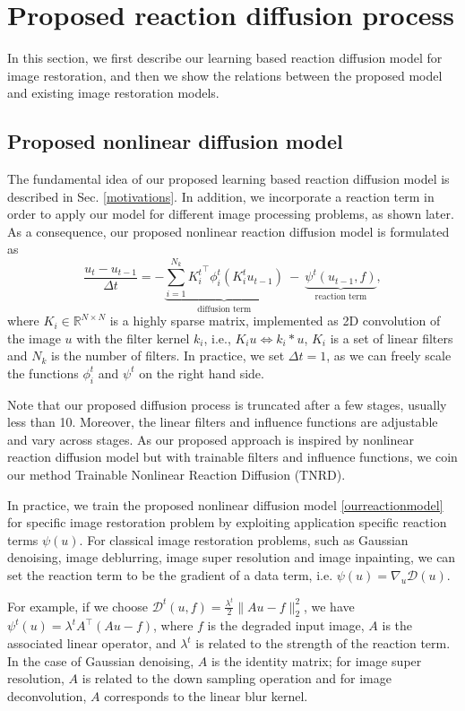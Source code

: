 \documentclass[10pt,journal,compsoc]{IEEEtran}
\newcommand{\cD}{\mathcal{D}}
\newcommand{\R}{\mathbb{R}}
\newcommand{\suml}[2]{\sum\limits_{#1}^{#2}}
\begin{document}
\section{Proposed reaction diffusion process}
{In this section, we first describe our learning based reaction 
diffusion model for image restoration, and then 
we show the relations between the proposed model and existing image 
restoration models. 
\subsection{Proposed nonlinear diffusion model}
The fundamental idea of our proposed learning based reaction diffusion 
model is described in Sec. \ref{motivations}. In addition, 
we incorporate a reaction term in order to apply our model for 
different image processing problems, as shown later. 
As a consequence, our proposed nonlinear reaction diffusion model is formulated as
\begin{equation}\label{ourreactionmodel}
\frac{u_{t} - u_{t-1}}{\Delta t} = 
-\underbrace{\suml{i = 1}{N_k}{K_i^t}^\top \phi_i^t(K_i^t u_{t-1})}_\text{diffusion term}~ - ~
\underbrace{\psi^t(u_{t-1}, f)}_\text{reaction term},
\end{equation}
where $K_i \in \R^{N \times N}$ is a highly sparse matrix, implemented as 
2D convolution of the image $u$ 
with the filter kernel $k_i$, i.e., $K_i u \Leftrightarrow k_i*u$, 
$K_i$ is a set of linear filters and $N_k$ is the number of filters. 
In practice, we set $\Delta t = 1$, as we can freely scale the functions 
$\phi_i^t$ and $\psi^t$ on the right hand side. 

Note that our proposed diffusion process is truncated after a few stages, usually 
less than 10. Moreover, the linear filters and influence functions 
are adjustable and vary across stages. As our proposed approach is inspired by nonlinear reaction diffusion model but with trainable filters and 
influence functions, we coin our method Trainable Nonlinear Reaction Diffusion (TNRD). 

In practice, 
we train the proposed nonlinear diffusion model \eqref{ourreactionmodel} 
for specific image restoration problem by exploiting 
application specific reaction terms $\psi(u)$. 
For classical image restoration problems, such as
Gaussian denoising, image deblurring, image super resolution and image
inpainting, we can set the reaction term to be the gradient of a data
term, i.e. $\psi(u) = \nabla_u \cD(u)$. 

For example, if we choose $\cD^t(u, f) =
\frac{\lambda^t}{2} \|A u - f\|_2^2$, we have $\psi^t(u) = \lambda^t A^\top(Au -
f)$, where $f$ is the degraded input image, $A$ is the
associated linear operator, and $\lambda^t$ is related to the strength
of the reaction term. In the case of Gaussian denoising, $A$ is the
identity matrix; for image super resolution, $A$ is related to the down sampling operation and for image 
deconvolution, $A$ corresponds to the linear blur kernel.

}
\end{document}
